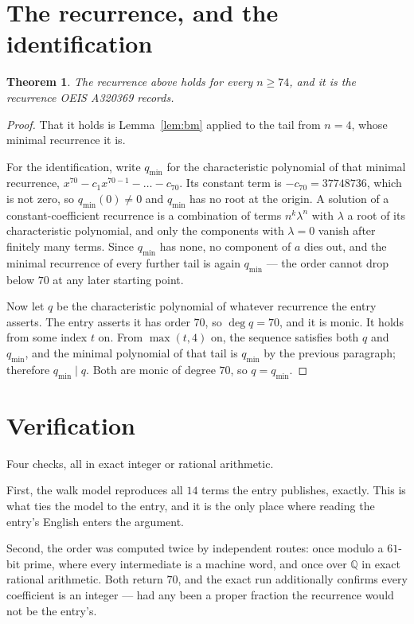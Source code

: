 \documentclass[11pt,a4paper]{article}
\theoremstyle{plain}
\newtheorem{theorem}{Theorem}
\theoremstyle{definition}
\begin{document}
\section{The recurrence, and the identification}

\begin{theorem}
The recurrence above holds for every $n\ge74$, and it is the recurrence OEIS A320369 records.
\end{theorem}

\begin{proof}
That it holds is Lemma~\ref{lem:bm} applied to the tail from $n=4$, whose minimal
recurrence it is.

For the identification, write $q_{\min}$ for the characteristic polynomial of that minimal
recurrence, $x^{70}-c_1x^{70-1}-\dots-c_{70}$. Its constant term is
$-c_{70}=37748736$, which is not zero, so $q_{\min}(0)\neq0$ and $q_{\min}$ has no
root at the origin. A solution of a constant-coefficient recurrence is a combination of terms
$n^{k}\lambda^{n}$ with $\lambda$ a root of its characteristic polynomial, and only the
components with $\lambda=0$ vanish after finitely many terms. Since $q_{\min}$ has none, no
component of $a$ dies out, and the minimal recurrence of every further tail is again
$q_{\min}$ --- the order cannot drop below $70$ at any later starting point.

Now let $q$ be the characteristic polynomial of whatever recurrence the entry asserts. The
entry asserts it has order $70$, so $\deg q=70$, and it is monic. It holds from some
index $t$ on. From $\max(t,4)$ on, the sequence satisfies both $q$ and $q_{\min}$, and
the minimal polynomial of that tail is $q_{\min}$ by the previous paragraph; therefore
$q_{\min}\mid q$. Both are monic of degree $70$, so $q=q_{\min}$.
\end{proof}

\section{Verification}

Four checks, all in exact integer or rational arithmetic.

First, the walk model reproduces all $14$ terms the entry publishes, exactly. This is
what ties the model to the entry, and it is the only place where reading the entry's English
enters the argument.

Second, the order was computed twice by independent routes: once modulo a $61$-bit prime, where
every intermediate is a machine word, and once over $\mathbb{Q}$ in exact rational arithmetic.
Both return $70$, and the exact run additionally confirms every coefficient is an integer
--- had any been a proper fraction the recurrence would not be the entry's.
\end{document}
